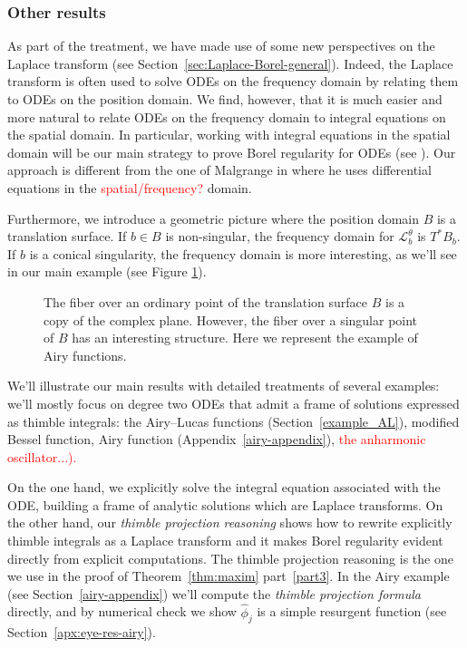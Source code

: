 \documentclass{article}
\theoremstyle{definition}
\newcommand{\laplace}{\mathcal{L}}
\theoremstyle{plain}
\begin{document}
\subsubsection{Other results}
%
As part of the treatment, we have made use of some new perspectives on the Laplace transform (see Section~\ref{sec:Laplace-Borel-general}). Indeed, the Laplace transform is often used to solve ODEs on the frequency domain by relating them to ODEs on the position domain. We find, however, that it is much easier and more natural to relate ODEs on the frequency domain to integral equations on the spatial domain. In particular, working with integral equations in the spatial domain will be our main strategy to prove Borel regularity for ODEs (see \cite[Theorem 4]{reg-sing-volterra}). Our approach is different from the one of Malgrange in \cite{malgrange--fourier} where he uses differential equations in the \textcolor{red}{spatial/frequency?} domain. 

Furthermore, we introduce a geometric picture where the position domain $B$ is a translation surface. If $b \in B$ is non-singular, the frequency domain for $\laplace_b^\theta$ is $T^* B_b$. If $b$ is a conical singularity, the frequency domain is more interesting, as we'll see in our main example (see Figure \ref{fig:different_fibres}). 


\begin{figure}[h]
    \centering
    \caption{The fiber over an ordinary point of the translation surface $B$ is a copy of the complex plane. However, the fiber over a singular point of $B$ has an interesting structure. Here we represent the example of Airy functions.}
    \label{fig:different_fibres}
\end{figure}
We’ll illustrate our main results with detailed treatments of several examples: we’ll mostly focus on degree two ODEs that admit a frame of solutions expressed as thimble integrals: the Airy--Lucas functions (Section~\ref{example_AL}), modified Bessel function, Airy function (Appendix~\ref{airy-appendix}), \textcolor{red}{the anharmonic oscillator...).} 

On the one hand, we explicitly solve the integral equation associated with the ODE, building a frame of analytic solutions which are Laplace transforms. On the other hand, our \textit{thimble projection reasoning} shows how to rewrite explicitly thimble integrals as a Laplace transform and it makes Borel regularity evident directly from explicit computations. The thimble projection reasoning is the one we use in the proof of Theorem~\ref{thm:maxim} part~\ref{part3}. In the Airy example (see Section~\ref{airy-appendix}) we’ll compute the \textit{thimble projection formula} directly, and by numerical check we show $\hat{\phi}_j$ is a simple resurgent function (see Section~\ref{apx:eye-res-airy}).
\end{document}
